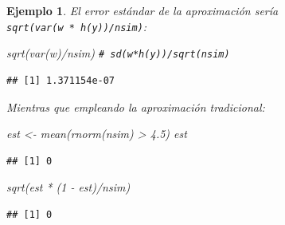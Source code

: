 \documentclass[
]{book}
\newenvironment{Shaded}{\begin{snugshade}}{\end{snugshade}}
\newcommand{\CommentTok}[1]{\textcolor[rgb]{0.56,0.35,0.01}{\textit{#1}}}
\newcommand{\DecValTok}[1]{\textcolor[rgb]{0.00,0.00,0.81}{#1}}
\newcommand{\FloatTok}[1]{\textcolor[rgb]{0.00,0.00,0.81}{#1}}
\newcommand{\FunctionTok}[1]{\textcolor[rgb]{0.00,0.00,0.00}{#1}}
\newcommand{\NormalTok}[1]{#1}
\newcommand{\OtherTok}[1]{\textcolor[rgb]{0.56,0.35,0.01}{#1}}
\newcommand{\SpecialCharTok}[1]{\textcolor[rgb]{0.00,0.00,0.00}{#1}}
\theoremstyle{break}
\newtheorem{example}{Ejemplo}[chapter]
\theoremstyle{nonumberplain}
\renewcommand{\CommentTok}[1]{\textcolor[rgb]{0.41,0.41,0.41}{\texttt{#1}}}
\begin{document}
\begin{example}
El error estándar de la aproximación sería \texttt{sqrt(var(w\ *\ h(y))/nsim)}:

\begin{Shaded}
\begin{Highlighting}[]
\FunctionTok{sqrt}\NormalTok{(}\FunctionTok{var}\NormalTok{(w)}\SpecialCharTok{/}\NormalTok{nsim) }\CommentTok{\# sd(w*h(y))/sqrt(nsim)   }
\end{Highlighting}
\end{Shaded}

\begin{verbatim}
## [1] 1.371154e-07
\end{verbatim}

Mientras que empleando la aproximación tradicional:

\begin{Shaded}
\begin{Highlighting}[]
\NormalTok{est }\OtherTok{\textless{}{-}} \FunctionTok{mean}\NormalTok{(}\FunctionTok{rnorm}\NormalTok{(nsim) }\SpecialCharTok{\textgreater{}} \FloatTok{4.5}\NormalTok{)}
\NormalTok{est}
\end{Highlighting}
\end{Shaded}

\begin{verbatim}
## [1] 0
\end{verbatim}

\begin{Shaded}
\begin{Highlighting}[]
\FunctionTok{sqrt}\NormalTok{(est }\SpecialCharTok{*}\NormalTok{ (}\DecValTok{1} \SpecialCharTok{{-}}\NormalTok{ est)}\SpecialCharTok{/}\NormalTok{nsim)}
\end{Highlighting}
\end{Shaded}

\begin{verbatim}
## [1] 0
\end{verbatim}

\end{example}
\end{document}
